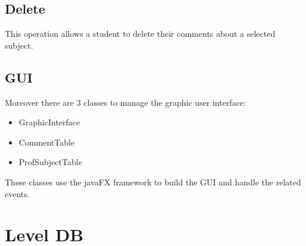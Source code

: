 \documentclass[a4paper, oneside]{article}
\begin{document}
\subsection{Delete}
This operation allows a student to delete their comments about a selected subject.\\
\vspace{2mm}

\vspace{5mm}

\subsection{GUI}
Moreover there are 3 classes to manage the graphic user interface: 
\begin{itemize}
\item GraphicInterface
\item CommentTable
\item ProfSubjectTable
\end{itemize}
 These classes use the javaFX framework to build the GUI and handle the related events.

\clearpage


\section{Level DB}
\end{document}
